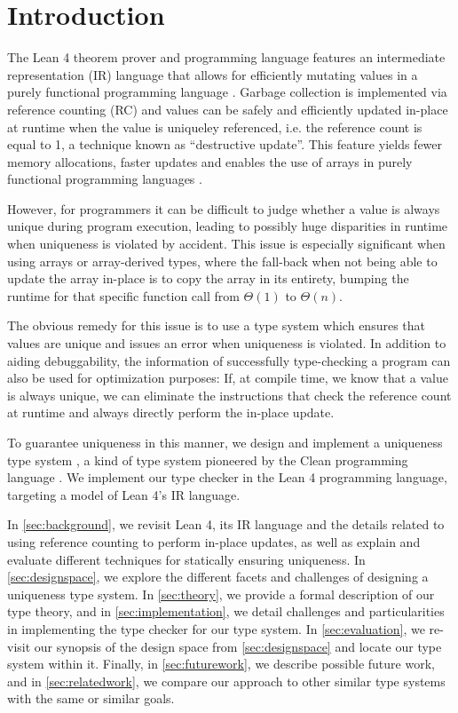 \chapter{Introduction}\label{sec:intro}

The Lean 4 theorem prover and programming language \citep{de_moura_lean_2021} features an intermediate representation (IR) language that allows for efficiently mutating values in a purely functional programming language \citep{ullrich_counting_2020}. Garbage collection is implemented via reference counting (RC) and values can be safely and efficiently updated in-place at runtime when the value is uniqueley referenced, i.e. the reference count is equal to 1, a technique known as ``destructive update''. This feature yields fewer memory allocations, faster updates and enables the use of arrays in purely functional programming languages \citep{ullrich_counting_2020}.

However, for programmers it can be difficult to judge whether a value is always unique during program execution, leading to possibly huge disparities in runtime when uniqueness is violated by accident. This issue is especially significant when using arrays or array-derived types, where the fall-back when not being able to update the array in-place is to copy the array in its entirety, bumping the runtime for that specific function call from $\Theta(1)$ to $\Theta(n)$.

The obvious remedy for this issue is to use a type system which ensures that values are unique and issues an error when uniqueness is violated. In addition to aiding debuggability, the information of successfully type-checking a program can also be used for optimization purposes: If, at compile time, we know that a value is always unique, we can eliminate the instructions that check the reference count at runtime and always directly perform the in-place update.

To guarantee uniqueness in this manner, we design and implement a uniqueness type system \citep{sergey_linearity_2022}, a kind of type system pioneered by the Clean programming language \citep{smetsers_guaranteeing_1994}. We implement our type checker in the Lean 4 programming language, targeting a model of Lean 4's IR language.

In \cref{sec:background}, we revisit Lean 4, its IR language and the details related to using reference counting to perform in-place updates, as well as explain and evaluate different techniques for statically ensuring uniqueness. In \cref{sec:designspace}, we explore the different facets and challenges of designing a uniqueness type system. In \cref{sec:theory}, we provide a formal description of our type theory, and in \cref{sec:implementation}, we detail challenges and particularities in implementing the type checker for our type system. In \cref{sec:evaluation}, we re-visit our synopsis of the design space from \cref{sec:designspace} and locate our type system within it. Finally, in \cref{sec:futurework}, we describe possible future work, and in \cref{sec:relatedwork}, we compare our approach to other similar type systems with the same or similar goals.